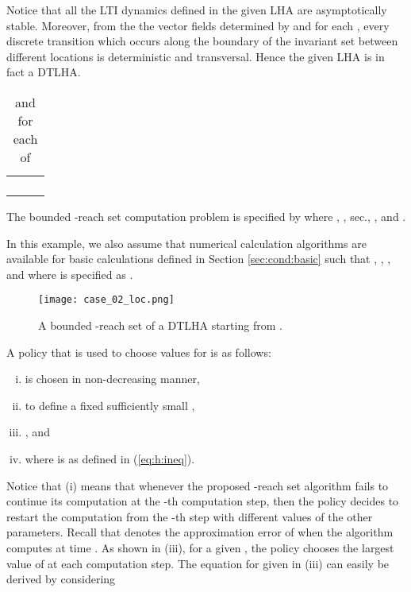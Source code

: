 Notice that all the LTI dynamics defined in the given LHA  are asymptotically stable.
Moreover, from the the vector fields determined by  and  for each , every discrete transition which occurs along the boundary of the invariant set between different locations is deterministic and transversal. 
Hence the given LHA  is in fact a DTLHA.



\begin{table}[htdp]
\caption{ and  for each  of }
\begin{center}
{\small
\begin{tabular}{c|p{}|c}
\toprule
 & \centering{} &  \\ 
\midrule
 & \centering{} &  \\ 
 & \centering{} &  \\ 
 & \centering{} &  \\ 
 & \centering{} &  \\ 
\bottomrule
\end{tabular}
}
\end{center}
\label{tab:ex:Au}
\end{table}

The bounded -reach set computation problem is specified by  where , ,  sec., , and .

In this example, we also assume that numerical calculation algorithms are available for basic calculations defined in Section \ref{sec:cond:basic} such that , , , and  where  is specified as .


\begin{figure}
\begin{center}
	\texttt{[image: case\_02\_loc.png]}
\caption{A bounded -reach set of a DTLHA  starting from .}	
\label{fig:eg:rho}
\end{center}
\end{figure}



A policy that is used to choose values for  is as follows:
\begin{enumerate}[(i)]
	\item  is chosen in non-decreasing manner, 
	\item  to define a fixed sufficiently small ,
	\item , and
	\item  where  is as defined in (\ref{eq:h:ineq}).
\end{enumerate}
Notice that (i) means that whenever the proposed -reach set algorithm fails to continue its computation at the -th computation step, then the policy decides to restart the computation from the -th step with different values of the other parameters.
Recall that  denotes the approximation error of  when the algorithm computes  at time .
As shown in (iii), for a given , the policy chooses the largest value of  at each computation step.
The equation for  given in (iii) can easily be derived by considering 


